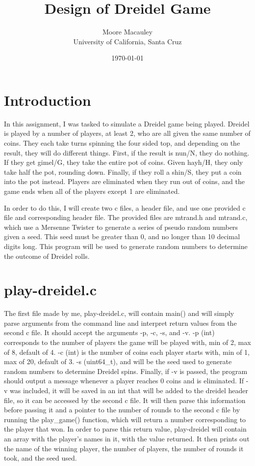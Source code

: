 \documentclass[11pt]{article}
\title{Design of Dreidel Game}
\author{Moore Macauley \\ University of California, Santa Cruz}
\date{\today}
\begin{document}
\maketitle

\section{Introduction}

In this assignment, I was tasked to simulate a Dreidel game being played. Dreidel is played by a number of players, at least 2, who are all given the same number of coins. They each take turns spinning the four sided top, and depending on the result, they will do different things. First, if the result is nun/N, they do nothing. If they get gimel/G, they take the entire pot of coins. Given hayh/H, they only take half the pot, rounding down. Finally, if they roll a shin/S, they put a coin into the pot instead. Players are eliminated when they run out of coins, and the game ends when all of the players except 1 are eliminated.

In order to do this, I will create two c files, a header file, and use one provided c file and corresponding header file. The provided files are mtrand.h and mtrand.c, which use a Mersenne Twister to generate a series of pseudo random numbers given a seed. This seed must be greater than 0, and no longer than 10 decimal digits long. This program will be used to generate random numbers to determine the outcome of Dreidel rolls.

\section{play-dreidel.c}

 The first file made by me, play-dreidel.c, will contain main() and will simply parse arguments from the command line and interpret return values from the second c file. It should accept the arguments -p, -c, -s, and -v. -p (int) corresponds to the number of players the game will be played with, min of 2, max of 8, default of 4. -c (int) is the number of coins each player starts with, min of 1, max of 20, default of 3. -s (uint64\_t), and will be the seed used to generate random numbers to determine Dreidel spins. Finally, if -v is passed, the program should output a message whenever a player reaches 0 coins and is eliminated. If -v was included, it will be saved in an int that will be added to the dreidel header file, so it can be accessed by the second c file. It will then parse this information before passing it and a pointer to the number of rounds to the second c file by running the play\_game() function, which will return a number corresponding to the player that won. In order to parse this return value, play-dreidel will contain an array with the player's names in it, with the value returned. It then prints out the name of the winning player, the number of players, the number of rounds it took, and the seed used.
\end{document}
